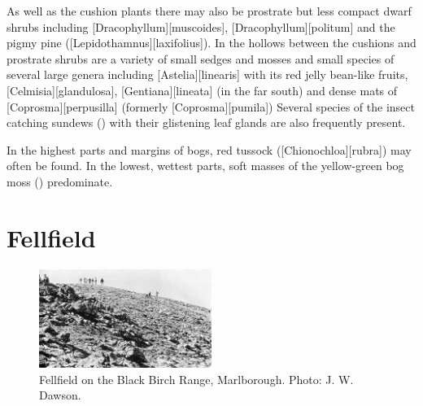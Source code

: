 As well as the cushion plants there may also be prostrate but less compact dwarf shrubs including [Dracophyllum][muscoides], [Dracophyllum][politum] and the pigmy pine ([Lepidothamnus][laxifolius]).
In the hollows between the cushions and prostrate shrubs are a variety of small sedges and mosses and small species of several large genera including [Astelia][linearis] with its red jelly bean-like fruits, [Celmisia][glandulosa], [Gentiana][lineata] (in the far south) and dense mats of [Coprosma][perpusilla] (formerly [Coprosma][pumila]) Several species of the insect catching sundews () with their glistening leaf glands are also frequently present.

In the highest parts and margins of bogs, red tussock ([Chionochloa][rubra]) may often be found.
In the lowest, wettest parts, soft masses of the yellow-green bog moss () predominate.

\section{Fellfield}

\begin{figure}
	\includegraphics[width=0.5\textwidth]{graphics/figure105fellfield.jpg}
	\centering
	\caption[Fellfield on the Black Birch Range]{Fellfield on the Black Birch Range, Marlborough.
	Photo: J. W. Dawson.}%
	\label{fig:105fellfield}
\end{figure}

